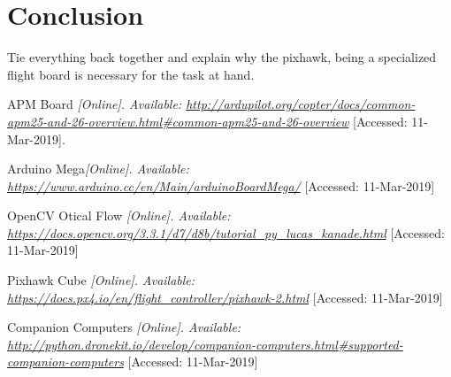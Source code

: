 \documentclass[conference,12pt, ]{IEEEtran}
\begin{document}
\section{Conclusion}
Tie everything back together and explain why the pixhawk, being a specialized flight board is necessary for the task at hand.

\clearpage
  \begin{thebibliography}{999}

    APM Board  {\em [Online]. Available: \url{http://ardupilot.org/copter/docs/common-apm25-and-26-overview.html#common-apm25-and-26-overview}} [Accessed: 11-Mar-2019].

   Arduino Mega{\em [Online]. Available: \url{https://www.arduino.cc/en/Main/arduinoBoardMega/}} [Accessed: 11-Mar-2019]

   OpenCV Otical Flow {\em [Online]. Available: \url{https://docs.opencv.org/3.3.1/d7/d8b/tutorial_py_lucas_kanade.html}} [Accessed: 11-Mar-2019]

 Pixhawk Cube {\em [Online]. Available: \url{https://docs.px4.io/en/flight_controller/pixhawk-2.html}} [Accessed: 11-Mar-2019]

 Companion Computers {\em [Online]. Available: \url{http://python.dronekit.io/develop/companion-computers.html#supported-companion-computers}} [Accessed: 11-Mar-2019]

  \end{thebibliography}
\end{document}
